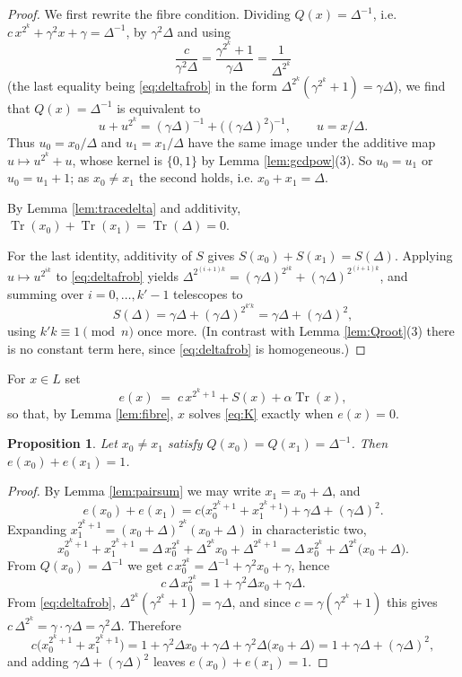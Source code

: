 \documentclass[11pt,a4paper]{article}
\newtheorem{proposition}[theorem]{Proposition}
\theoremstyle{definition}
\newcommand{\Tr}{\operatorname{Tr}}
\begin{document}
\begin{proof}
We first rewrite the fibre condition.  Dividing $Q(x)=\Delta^{-1}$, i.e.
$c\,x^{2^{k}}+\gamma^{2}x+\gamma=\Delta^{-1}$, by $\gamma^{2}\Delta$ and using
\[
  \frac{c}{\gamma^{2}\Delta}=\frac{\gamma^{2^{k}}+1}{\gamma\Delta}
  =\frac{1}{\Delta^{2^{k}}}
\]
(the last equality being \eqref{eq:deltafrob} in the form
$\Delta^{2^{k}}(\gamma^{2^{k}}+1)=\gamma\Delta$), we find that
$Q(x)=\Delta^{-1}$ is equivalent to
\[
  u+u^{2^{k}}=(\gamma\Delta)^{-1}+\bigl((\gamma\Delta)^{2}\bigr)^{-1},
  \qquad u=x/\Delta .
\]
Thus $u_0=x_0/\Delta$ and $u_1=x_1/\Delta$ have the same image under the additive
map $u\mapsto u^{2^{k}}+u$, whose kernel is $\{0,1\}$ by Lemma
\ref{lem:gcdpow}(3).  So $u_0=u_1$ or $u_0=u_1+1$; as $x_0\neq x_1$ the second
holds, i.e. $x_0+x_1=\Delta$.

By Lemma \ref{lem:tracedelta} and additivity, $\Tr(x_0)+\Tr(x_1)=\Tr(\Delta)=0$.

For the last identity, additivity of $S$ gives $S(x_0)+S(x_1)=S(\Delta)$.  Applying
$u\mapsto u^{2^{ik}}$ to \eqref{eq:deltafrob} yields
$\Delta^{2^{(i+1)k}}=(\gamma\Delta)^{2^{ik}}+(\gamma\Delta)^{2^{(i+1)k}}$, and
summing over $i=0,\dots,k'-1$ telescopes to
\[
  S(\Delta)=\gamma\Delta+(\gamma\Delta)^{2^{k'k}}=\gamma\Delta+(\gamma\Delta)^{2},
\]
using $k'k\equiv1\pmod n$ once more.  (In contrast with Lemma \ref{lem:Qroot}(3)
there is no constant term here, since \eqref{eq:deltafrob} is homogeneous.)
\end{proof}

For $x\in L$ set
\[
  e(x)\;=\;c\,x^{2^{k}+1}+S(x)+\alpha\Tr(x),
\]
so that, by Lemma \ref{lem:fibre}, $x$ solves \eqref{eq:K} exactly when $e(x)=0$.

\begin{proposition}\label{prop:e0e1}
Let $x_0\neq x_1$ satisfy $Q(x_0)=Q(x_1)=\Delta^{-1}$.  Then
$e(x_0)+e(x_1)=1$.
\end{proposition}

\begin{proof}
By Lemma \ref{lem:pairsum} we may write $x_1=x_0+\Delta$, and
\[
  e(x_0)+e(x_1)=c\bigl(x_0^{2^{k}+1}+x_1^{2^{k}+1}\bigr)+\gamma\Delta+(\gamma\Delta)^{2}.
\]
Expanding $x_1^{2^{k}+1}=(x_0+\Delta)^{2^{k}}(x_0+\Delta)$ in characteristic two,
\[
  x_0^{2^{k}+1}+x_1^{2^{k}+1}
   =\Delta\,x_0^{2^{k}}+\Delta^{2^{k}}x_0+\Delta^{2^{k}+1}
   =\Delta\,x_0^{2^{k}}+\Delta^{2^{k}}\bigl(x_0+\Delta\bigr).
\]
From $Q(x_0)=\Delta^{-1}$ we get $c\,x_0^{2^{k}}=\Delta^{-1}+\gamma^{2}x_0+\gamma$,
hence
\[
  c\,\Delta\,x_0^{2^{k}}=1+\gamma^{2}\Delta x_0+\gamma\Delta .
\]
From \eqref{eq:deltafrob}, $\Delta^{2^{k}}(\gamma^{2^{k}}+1)=\gamma\Delta$, and
since $c=\gamma(\gamma^{2^{k}}+1)$ this gives
$c\,\Delta^{2^{k}}=\gamma\cdot\gamma\Delta=\gamma^{2}\Delta$.  Therefore
\[
  c\bigl(x_0^{2^{k}+1}+x_1^{2^{k}+1}\bigr)
  =1+\gamma^{2}\Delta x_0+\gamma\Delta+\gamma^{2}\Delta\bigl(x_0+\Delta\bigr)
  =1+\gamma\Delta+(\gamma\Delta)^{2},
\]
and adding $\gamma\Delta+(\gamma\Delta)^{2}$ leaves $e(x_0)+e(x_1)=1$.
\end{proof}
\end{document}
